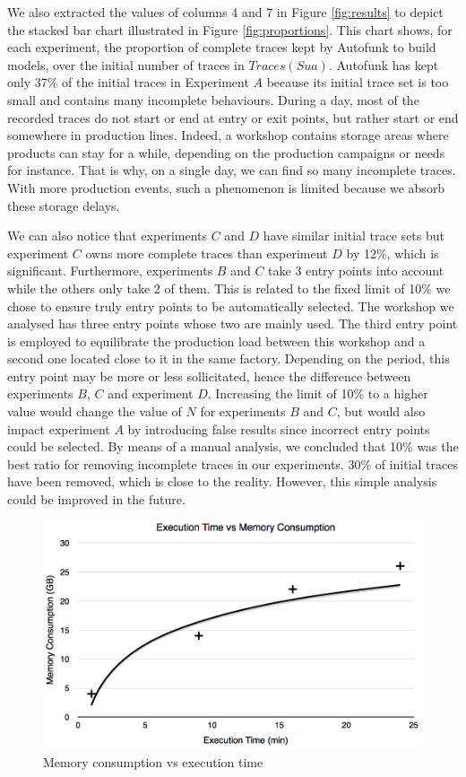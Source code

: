 We also extracted the values of columns 4 and 7 in Figure
\ref{fig:results} to depict the stacked bar chart illustrated in
Figure \ref{fig:proportions}. This chart shows, for each experiment, the
proportion of complete traces kept by Autofunk to build
models, over the initial number of traces in $Traces(Sua)$.
Autofunk has kept only 37\% of the initial traces in
Experiment $A$ because its initial trace set is too small and
contains many incomplete behaviours. During a day, most of the
recorded traces do not start or end at entry or exit points, but
rather start or end somewhere in production lines. Indeed,
a workshop contains storage areas where products can stay
for a while, depending on the production campaigns or needs for
instance. That is why, on a single day, we can find so many
incomplete traces. With more production events, such a phenomenon
is limited because we absorb these storage delays.

We can also notice that experiments $C$ and $D$ have similar
initial trace sets but experiment $C$ owns more complete traces
than experiment $D$ by 12\%, which is significant. Furthermore, experiments
$B$ and $C$ take 3 entry points into account while the others only
take 2 of them. This is related to the fixed limit of 10\% we
chose to ensure truly entry points to be automatically selected.
The workshop we analysed has three entry points whose two are
mainly used. The third entry point is employed to equilibrate the
production load between this workshop and a second one located
close to it in the same factory. Depending on the period, this
entry point may be more or less sollicitated, hence the
difference between experiments $B$, $C$ and experiment $D$.
Increasing the limit of 10\% to a higher value would change the value
of $N$ for experiments $B$ and $C$, but would also impact
experiment $A$ by introducing false results since incorrect entry
points could be selected. By means of a manual analysis, we
concluded that 10\% was the best ratio for removing incomplete
traces in our experiments. 30\% of initial traces have been
removed, which is close to the reality. However, this simple
analysis could be improved in the future.

\begin{figure}[ht]
  \includegraphics[width=0.8\linewidth]{figures/memory-time.png}

  \caption{Memory consumption vs execution time}
  \label{fig:memory-time}
\end{figure}

